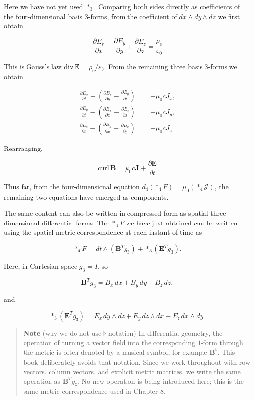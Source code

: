 \documentclass[a4paper,12pt,openany]{book}
\begin{document}
Here we have not yet used \(\ast_3\). Comparing both sides directly as
coefficients of the four-dimensional basis \(3\)-forms, from the
coefficient of \(dx\wedge dy\wedge dz\) we first obtain

\[
\frac{\partial E_x}{\partial x}+\frac{\partial E_y}{\partial y}+\frac{\partial E_z}{\partial z}=\frac{\rho_{\mathrm e}}{\varepsilon_0}
\]

This is Gauss's law
\(\mathrm{div}\,\mathbf E=\rho_{\mathrm e}/\varepsilon_0\). From the
remaining three basis \(3\)-forms we obtain

\[
\begin{aligned}
\frac{\partial E_x}{\partial t}-\left(\frac{\partial B_z}{\partial y}-\frac{\partial B_y}{\partial z}\right)&=-\mu_0 cJ_x,\\
\frac{\partial E_y}{\partial t}-\left(\frac{\partial B_x}{\partial z}-\frac{\partial B_z}{\partial x}\right)&=-\mu_0 cJ_y,\\
\frac{\partial E_z}{\partial t}-\left(\frac{\partial B_y}{\partial x}-\frac{\partial B_x}{\partial y}\right)&=-\mu_0 cJ_z
\end{aligned}
\]

Rearranging,

\[
\mathrm{curl}\,\mathbf{B} = \mu_0 c \mathbf{J} + \frac{\partial \mathbf{E}}{\partial t}
\]

Thus far, from the four-dimensional equation
\(d_4(\ast_4F)=\mu_0(\ast_4\mathcal{J})\), the remaining two equations
have emerged as components.

The same content can also be written in compressed form as spatial
three-dimensional differential forms. The \(\ast_4F\) we have just
obtained can be written using the spatial metric correspondence at each
instant of time as

\[
\ast_4F
=
dt\wedge(\mathbf B^Tg_3)+\ast_3(\mathbf E^Tg_3).
\]

Here, in Cartesian space \(g_3=I\), so

\[
\mathbf B^Tg_3
=
B_x\,dx+B_y\,dy+B_z\,dz,
\]

and

\[
\ast_3(\mathbf E^Tg_3)
=
E_x\,dy\wedge dz+E_y\,dz\wedge dx+E_z\,dx\wedge dy.
\]

\begin{quote}
\textbf{Note} (why we do not use \(\flat\) notation) In differential
geometry, the operation of turning a vector field into the corresponding
\(1\)-form through the metric is often denoted by a musical symbol, for
example \(\mathbf B^\flat\). This book deliberately avoids that
notation. Since we work throughout with row vectors, column vectors, and
explicit metric matrices, we write the same operation as
\(\mathbf B^Tg_3\). No new operation is being introduced here; this is
the same metric correspondence used in Chapter 8.
\end{quote}
\end{document}
